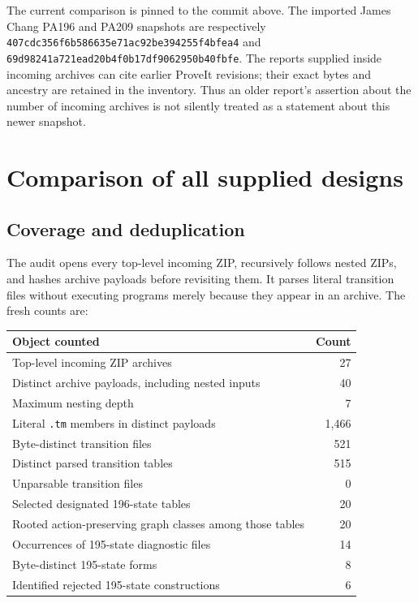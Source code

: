 \documentclass[11pt,letterpaper]{article}
\newcommand{\file}[1]{\texttt{\nolinkurl{#1}}}
\begin{document}
The current comparison is pinned to the commit above. The imported
James Chang PA196 and PA209 snapshots are respectively
\file{407cdc356f6b586635e71ac92be394255f4bfea4} and
\file{69d98241a721ead20b4f0b17df9062950b40fbfe}.
The reports supplied inside incoming archives can cite earlier ProveIt
revisions; their exact bytes and ancestry are retained in the inventory.
Thus an older report's assertion about the number of incoming archives is
not silently treated as a statement about this newer snapshot.

\section{Comparison of all supplied designs}
\subsection{Coverage and deduplication}

The audit opens every top-level incoming ZIP, recursively follows nested
ZIPs, and hashes archive payloads before revisiting them. It parses literal
transition files without executing programs merely because they appear in
an archive. The fresh counts are:

\begin{center}
\begin{tabular}{@{}lr@{}}
\toprule
Object counted & Count\\
\midrule
Top-level incoming ZIP archives & 27\\
Distinct archive payloads, including nested inputs & 40\\
Maximum nesting depth & 7\\
Literal \file{.tm} members in distinct payloads & 1,466\\
Byte-distinct transition files & 521\\
Distinct parsed transition tables & 515\\
Unparsable transition files & 0\\
Selected designated 196-state tables & 20\\
Rooted action-preserving graph classes among those tables & 20\\
Occurrences of 195-state diagnostic files & 14\\
Byte-distinct 195-state forms & 8\\
Identified rejected 195-state constructions & 6\\
\bottomrule
\end{tabular}
\end{center}
\end{document}
